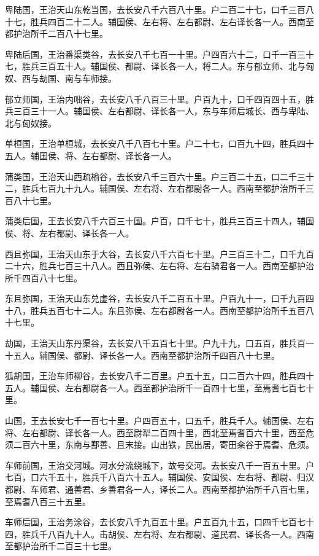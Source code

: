 \documentclass[]{article}
\begin{document}
卑陆国，王治天山东乾当国，去长安八千六百八十里。户二百二十七，口千三百八十七，胜兵四百二十二人。辅国侯、左右将、左右都尉、左右译长各一人。西南至都护治所千二百八十七里。

卑陆后国，王治番渠类谷，去长安八千七百一十里。户四百六十二，口千一百三十七，胜兵三百五十人。辅国侯、都尉、译长各一人，将二人。东与郁立师、北与匈奴、西与劫国、南与车师接。

郁立师国，王治内咄谷，去长安八千八百三十里。户百九十，口千四百四十五，胜兵三百三十一人。辅国侯、左右都尉、译长各一人，东与车师后城长、西与卑陆、北与匈奴接。

单桓国，王治单桓城，去长安八千八百七十里。户二十七，口百九十四，胜兵四十五人。辅国侯、将、左右都尉、译长各一人。

蒲类国，王治天山西疏榆谷，去长安八千三百六十里。户三百二十五，口二千三十二，胜兵七百九十九人。辅国侯、左右将、左右都尉各一人。西南至都护治所千三百八十七里。

蒲类后国，王去长安八千六百三十国。户百，口千七十，胜兵三百三十四人，辅国侯、将、左右都尉、译长各一人。

西且弥国，王治天山东于大谷，去长安八千六百七十里。户三百三十二，口千九百二十六，胜兵七百三十八人。西且弥侯、左右将、左右骑君各一人。西南至都护治所千四百八十七里。

东且弥国，王治天山东兑虚谷，去长安八千二百五十里。户百九十一，口千九百四十八，胜兵五百七十二人。东且弥侯、左右都尉各一人。西南至都护治所千五百八十七里。

劫国，王治天山东丹渠谷，去长安八千五百七十里。户九十九，口五百，胜兵百一十五人。辅国侯、都尉、译长各一人。西南至都护治所千四百八十七里。

狐胡国，王治车师柳谷，去长安八千二百里。户五十五，口二百六十四，胜兵四十五人。辅国侯、左右都尉各一人。西至都护治所千一百四十七里，至焉耆七百七十里。

山国，王去长安七千一百七十里。户四百五十，口五千，胜兵千人。辅国侯、左右将、左右都尉、译长各一人。西至尉犁二百四十里，西北至焉耆百六十里，西至危须二百六十里，东南与鄯善、且末接。山出铁，民出居，寄田籴谷于焉耆、危须。

车师前国，王治交河城。河水分流绕城下，故号交河。去长安八千一百五十里。户七百，口六千五十，胜兵千八百六十五人。辅国侯、安国侯、左右将、都尉、归汉都尉、车师君、通善君、乡善君各一人，译长二人。西南至都护治所千八百七里，至焉耆八百三十五里。

车师后国，王治务涂谷，去长安八千九百五十里。户五百九十五，口四千七百七十四，胜兵千八百九十人。击胡侯、左右将、左右都尉、道民君、译长各一人。西南至都护治所千二百三十七里。
\end{document}
